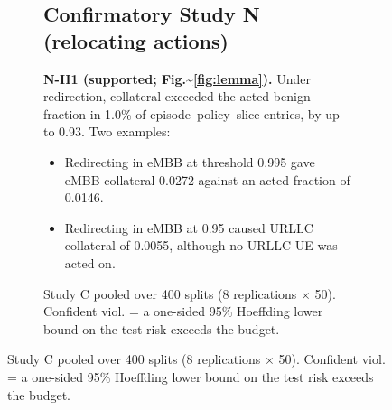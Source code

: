 \begin{figure}[!t]
{\begin{figure}[!t]
{\begin{table}[!t]
\centering
\caption{Study C pooled over 400 splits (8 replications $\times$ 50). Confident viol. = a one-sided 95\% Hoeffding lower bound on the test risk exceeds the budget.}
\label{tab:confirm_C_pooled}
\footnotesize
{}
\end{table}

\hypertarget{confirmatory-study-n-relocating-actions}{%
\subsection{Confirmatory Study N (relocating
actions)}\label{confirmatory-study-n-relocating-actions}}

\textbf{N-H1 (supported; Fig.\textasciitilde{}\ref{fig:lemma}).} Under
redirection, collateral exceeded the acted-benign fraction in 1.0\% of
episode--policy--slice entries, by up to 0.93. Two examples:

\begin{itemize}
\tightlist
\item
  Redirecting in eMBB at threshold 0.995 gave eMBB collateral 0.0272
  against an acted fraction of 0.0146.
\item
  Redirecting in eMBB at 0.95 caused URLLC collateral of 0.0055,
  although no URLLC UE was acted on.
\end{itemize}

}
\end{figure}}
\end{figure}
